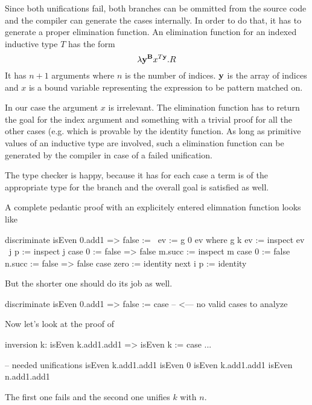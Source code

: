 Since both unifications fail, both branches can be ommitted from the source code
and the compiler can generate the cases internally. In order to do that, it has
to generate a proper elimination function. An elimination function for an
indexed inductive type $T$ has the form
$$
    \lambda \mathbf{y}^{\mathbf{B}} x^{T \mathbf{y}}. R
$$
It has $n + 1$ arguments where $n$ is the number of indices. $\mathbf{y}$ is the
array of indices and $x$ is a bound variable representing the expression to be
pattern matched on.

In our case the argument $x$ is irrelevant. The elimination function has to
return the goal  for the index argument  and
something with a trivial proof for all the other cases (e.g. 
which is provable by the identity function. As long as primitive values of an
inductive type are involved, such a elimination function can be generated by the
compiler in case of a failed unification.

The type checker is happy, because it has for each case a term is of the
appropriate type for the branch and the overall goal is satisfied as well.

A complete pedantic proof with an explicitely entered elimnation function looks
like
\begin{alba}
    discriminate isEven 0.add1 => false :=
        \ ev := g 0 ev where
            g k ev :=
                inspect
                    ev
                    \ j p := inspect j case
                        0 := false => false
                        m.succ :=
                            inspect m case
                                0 := false
                                n.succ := false => false
                case
                    zero :=
                        identity
                    next i p :=
                        identity
\end{alba}
But the shorter one should do its job as well.
\begin{alba}
    discriminate isEven 0.add1 => false :=
        case --  <--- no valid cases to analyze
\end{alba}

\vskip 5mm
Now let's look at the proof of

\begin{alba}
    inversion k: isEven k.add1.add1 => isEven k :=
        case ...

    -- needed unifications
    isEven k.add1.add1        isEven 0
    isEven k.add1.add1        isEven n.add1.add1
\end{alba}
The first one fails and the second one unifies $k$ with $n$.




